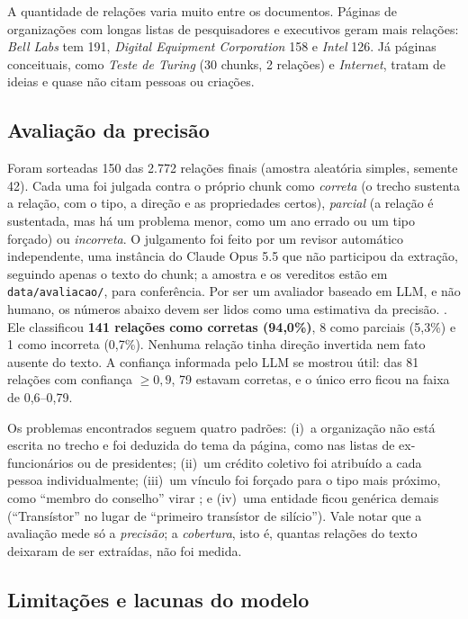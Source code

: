 A quantidade de relações varia muito entre os documentos. Páginas de organizações com longas listas de pesquisadores e executivos geram mais relações: \emph{Bell Labs} tem 191, \emph{Digital Equipment Corporation} 158 e \emph{Intel} 126. Já páginas conceituais, como \emph{Teste de Turing} (30 chunks, 2 relações) e \emph{Internet}, tratam de ideias e quase não citam pessoas ou criações.

\subsection{Avaliação da precisão}

Foram sorteadas 150 das 2.772 relações finais (amostra aleatória simples, semente 42). Cada uma foi julgada contra o próprio chunk como \emph{correta} (o trecho sustenta a relação, com o tipo, a direção e as propriedades certos), \emph{parcial} (a relação é sustentada, mas há um problema menor, como um ano errado ou um tipo forçado) ou \emph{incorreta}. O julgamento foi feito por um revisor automático independente, uma instância do Claude Opus 5.5 que não participou da extração, seguindo apenas o texto do chunk; a amostra e os vereditos estão em \texttt{data/avaliacao/}, para conferência. Por ser um avaliador baseado em LLM, e não humano, os números abaixo devem ser lidos como uma estimativa da precisão.
. Ele classificou \textbf{141 relações como corretas (94,0\%)}, 8 como parciais (5,3\%) e 1 como incorreta (0,7\%). Nenhuma relação tinha direção invertida nem fato ausente do texto. A confiança informada pelo LLM se mostrou útil: das 81 relações com confiança $\geq 0{,}9$, 79 estavam corretas, e o único erro ficou na faixa de 0,6--0,79.


Os problemas encontrados seguem quatro padrões: (i)~a organização não está escrita no trecho e foi deduzida do tema da página, como nas listas de ex-funcionários ou de presidentes; (ii)~um crédito coletivo foi atribuído a cada pessoa individualmente; (iii)~um vínculo foi forçado para o tipo mais próximo, como ``membro do conselho'' virar ; e (iv)~uma entidade ficou genérica demais (``Transístor'' no lugar de ``primeiro transístor de silício''). Vale notar que a avaliação mede só a \emph{precisão}; a \emph{cobertura}, isto é, quantas relações do texto deixaram de ser extraídas, não foi medida.

\subsection{Limitações e lacunas do modelo}

